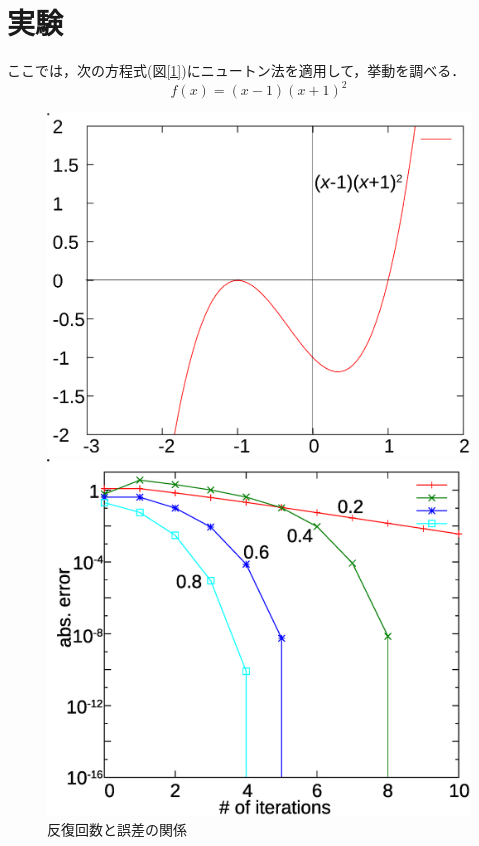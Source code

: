 \documentclass[a4j,11pt]{jarticle}
\begin{document}
\section{実験}
ここでは，次の方程式(図\ref{1})にニュートン法を適用して，挙動を調べる．
\begin{equation}
f(x)=(x-1)(x+1)^2
\label{eq:fx}
\end{equation}
\begin{figure}
\begin{minipage}[t]{200pt}
\center
\includegraphics[scale=0.35]{newton3.eps}
\caption{$(x-1)(x+1)^2のグラフ$}
\label{1}
\end{minipage}
\begin{minipage}[t]{230pt}
\center
\includegraphics[scale=0.35]{newtonresult2.eps}
\caption{反復回数と誤差の関係}
\label{newtonresult}
\end{minipage}
\end{figure}
\end{document}
